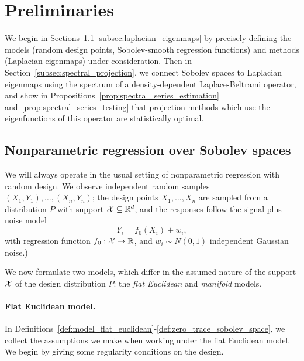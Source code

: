 \section{Preliminaries}
\label{sec:setup_main_results}

We begin in Sections~\ref{subsec:regression_laplacian_eigenmaps}-\ref{subsec:laplacian_eigenmaps} by precisely defining the models (random design points, Sobolev-smooth regression functions) and methods (Laplacian eigenmaps) under consideration. Then in Section~\ref{subsec:spectral_projection}, we connect Sobolev spaces to Laplacian eigenmaps using the spectrum of a density-dependent Laplace-Beltrami operator, and show in Propositions~\ref{prop:spectral_series_estimation} and~\ref{prop:spectral_series_testing} that projection methods which use the eigenfunctions of this operator are statistically optimal.

\subsection{Nonparametric regression over Sobolev spaces}
\label{subsec:regression_laplacian_eigenmaps}

We will always operate in the usual setting of nonparametric regression with random design. We observe independent random samples $(X_1,Y_1),\ldots,(X_n,Y_n)$; the design points $X_1,\ldots,X_n$ are sampled from a distribution $P$ with support $\mathcal{X} \subseteq \mathbb{R}^d$, and the responses follow the signal plus noise model
\begin{equation}
\label{eqn:model}
Y_i = f_0(X_i) + w_i,
\end{equation}
with regression function $f_0: \mathcal{X} \to \mathbb{R}$, and $w_i \sim N(0,1)$ independent Gaussian noise.)

We now formulate two models, which differ in the assumed nature of the support $\mathcal{X}$ of the design distribution $P$: the \emph{flat Euclidean} and \emph{manifold} models.

\paragraph{Flat Euclidean model.}
In Definitions~\ref{def:model_flat_euclidean}-\ref{def:zero_trace_sobolev_space}, we collect the assumptions we make when working under the flat Euclidean model. We begin by giving some regularity conditions on the design.

